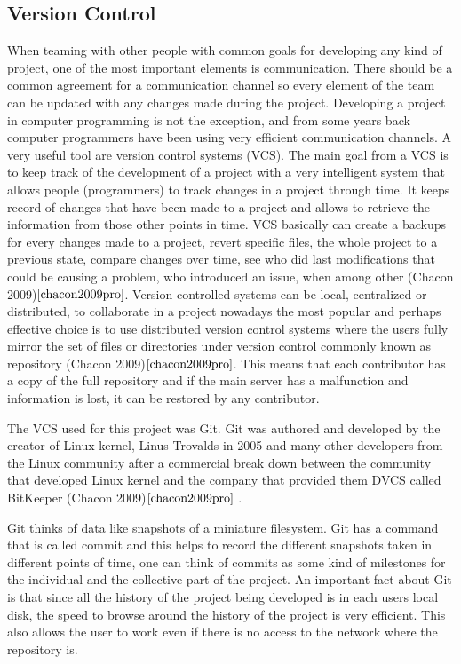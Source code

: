 \documentclass{article}
\begin{document}
\subsection{Version Control}
When teaming with other people with common goals for developing any kind of project, one of the most important elements is communication. There should be a common agreement for a communication channel so every element of the team can be updated with any changes made during the project. 
Developing a project in computer programming is not the exception, and from some years back computer programmers have been using very efficient communication channels. A very useful tool are version control systems (VCS). The main goal from a VCS is to keep track of the development of a project with a very intelligent system that allows people (programmers) to track changes in a project through time. It keeps record of changes that have been made to a project and allows to retrieve the information from those other points in time. VCS basically can create a backups for every changes made to a project, revert specific files, the whole project to a previous state, compare changes over time, see who did last modifications that could be causing a problem, who introduced an issue, when among other (Chacon 2009)$\cite{chacon2009pro}$. Version controlled systems can be local, centralized or distributed, to collaborate in a project nowadays the most popular and perhaps effective choice is to use distributed version control systems where the users fully mirror the set of files or directories under version control commonly known as repository (Chacon 2009)$\cite{chacon2009pro}$. This means that each contributor has a copy of the full repository and if the main server has a malfunction and information is lost, it can be restored by any contributor. 

The VCS used for this project was Git. Git was authored and developed by the creator of Linux kernel, Linus Trovalds in 2005 and many other developers from the Linux community after a commercial break down between the community that developed Linux kernel and the company that provided them DVCS called BitKeeper (Chacon 2009)$\cite{chacon2009pro}$ . 

Git thinks of data like snapshots of a miniature filesystem. Git has a command that is called commit and this helps to record the different snapshots taken in different points of time, one can think of commits as some kind of milestones for the individual and the collective part of the project. An important fact about Git is that since all the history of the project being developed is in each users local disk, the speed to browse around the history of the project is very efficient. This also allows the user to work even if there is no access to the network where the repository is. 
\end{document}
